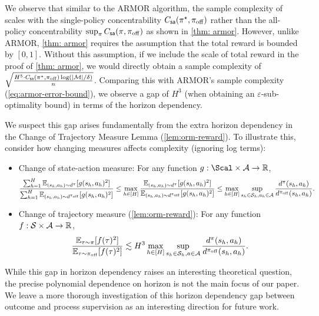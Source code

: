 \documentclass{article}
\begin{document}
We observe that similar to the ARMOR algorithm, the sample complexity of  scales with the single-policy concentrability $C_{\mathsf{sa}}(\pi^\star, \pi_{\mathrm{off}})$ rather than the all-policy concentrability $\sup_{\pi} C_{\mathsf{sa}}(\pi, \pi_{\mathrm{off}})$ as shown in \cref{thm: armor}. However, unlike ARMOR, \cref{thm: armor} requires the assumption that the total reward is bounded by $[0,1]$. Without this assumption, if we include the scale of total reward in the proof of \cref{thm: armor}, we would directly obtain a sample complexity of $\sqrt{\frac{H^5\cdot C_{\mathsf{sa}}(\pi^\star, \pi_{\mathrm{off}})\log(|\mathcal{M}| / \delta)}{n}}$. Comparing this with ARMOR's sample complexity (\cref{eq:armor-error-bound}), we observe a gap of $H^3$ (when obtaining an $\varepsilon$-sub-optimality bound) in terms of the horizon dependency.

We suspect this gap arises fundamentally from the extra horizon dependency in the Change of Trajectory Measure Lemma (\cref{lem:orm-reward}). To illustrate this, consider how changing measures affects complexity (ignoring log terms):
\begin{itemize}
    \item Change of state-action measure: For any function $g: \Scal \times \calA \to \RR$,
    \begin{align*}
        \frac{\sum_{h=1}^{H}\mathbb{E}_{(s_h,a_h)\sim d^\pi} [g(s_h,a_h)^2]}{\sum_{h=1}^{H}\mathbb{E}_{(s_h,a_h)\sim d^{\pi_{\mathrm{off}}}} [g(s_h,a_h)^2]} \leq \max_{h\in [H]}\frac{\mathbb{E}_{(s_h,a_h)\sim d^\pi} [g(s_h,a_h)^2]}{\mathbb{E}_{(s_h,a_h)\sim d^{\pi_{\mathrm{off}}}} [g(s_h,a_h)^2]} \leq \max_{h\in [H]}\sup_{s_h\in \mathcal{S}_h, a_h\in \mathcal{A}} \frac{d^\pi(s_h, a_h)}{d^{\pi_{\mathrm{off}}}(s_h, a_h)}.
    \end{align*}
    \item Change of trajectory measure (\cref{lem:orm-reward}): For any function $f: \mathcal{S} \times \mathcal{A} \to \mathbb{R}$,
    \begin{align*}
        \frac{\mathbb{E}_{\tau\sim \pi} [f(\tau)^2]}{\mathbb{E}_{\tau \sim \pi_{\mathrm{off}}} [f(\tau)^2]} \lesssim H^3 \max_{h\in [H]}\sup_{s_h\in \mathcal{S}_h, a\in \mathcal{A}} \frac{d^\pi(s_h, a_h)}{d^{\pi_{\mathrm{off}}}(s_h, a_h)}.
    \end{align*}
\end{itemize}

While this gap in horizon dependency raises an interesting theoretical question, the precise polynomial dependence on horizon is not the main focus of our paper. We leave a more thorough investigation of this horizon dependency gap between outcome and process supervision as an interesting direction for future work.
\end{document}

